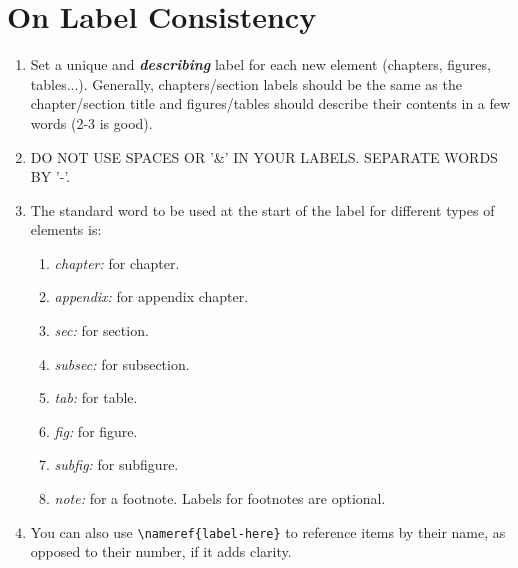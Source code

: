 \section*{On Label Consistency} \label{sec:label-consistency}
\begin{enumerate}[label=L.\arabic*]
    \item Set a unique and \textbf{\textit{describing}} label for each new element (chapters, figures, tables...). Generally, chapters/section labels should be the same as the chapter/section title and figures/tables should describe their contents in a few words (2-3 is good).
    \item DO NOT USE SPACES OR '\&' IN YOUR LABELS. SEPARATE WORDS BY '-'. 
    \item The standard word to be used at the start of the label for different types of elements is: 
    \begin{enumerate}[label*=.\arabic*]
        \item \textit{chapter:} for chapter.
        \item \textit{appendix:} for appendix chapter.
        \item \textit{sec:} for section.
        \item \textit{subsec:} for subsection.
        \item \textit{tab:} for table.
        \item \textit{fig:} for figure.
        \item \textit{subfig:} for subfigure.
        \item \textit{note:} for a footnote. Labels for footnotes are optional.
    \end{enumerate}
    
    \item You can also use \verb|\nameref{label-here}| to reference items by their name, as opposed to their number, if it adds clarity.
\end{enumerate}

